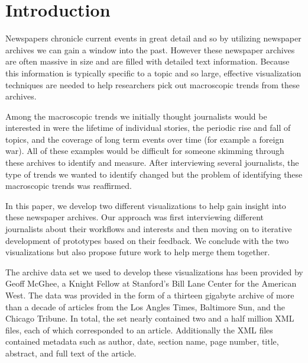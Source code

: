 \section{Introduction}
Newspapers chronicle current events in great detail and so by utilizing newspaper archives we can gain a window into the past. However these newspaper archives are often massive in size and are filled with detailed text information. Because this information is typically specific to a topic and so large, effective visualization techniques are needed to help researchers pick out macroscopic trends from these archives.

Among the macroscopic trends we initially thought journalists would be interested in were the lifetime of individual stories, the periodic rise and fall of topics, and the coverage of long term events over time (for example a foreign war). All of these examples would be difficult for someone skimming through these archives to identify and measure. After interviewing several journalists, the type of trends we wanted to identify changed but the problem of identifying these macroscopic trends was reaffirmed.

In this paper, we develop two different visualizations to help gain insight into these newspaper archives. Our approach was first interviewing different journalists about their workflows and interests and then moving on to iterative development of prototypes based on their feedback. We conclude with the two visualizations but also propose future work to help merge them together.

The archive data set we used to develop these visualizations has been provided by Geoff McGhee, a Knight Fellow at Stanford's Bill Lane Center for the American West. The data was provided in the form of a thirteen gigabyte archive of more than a decade of articles from the Los Angles Times, Baltimore Sun, and the Chicago Tribune. In total, the set nearly contained two and a half million XML files, each of which corresponded to an article. Additionally the XML files contained metadata such as author, date, section name, page number, title, abstract, and full text of the article.


